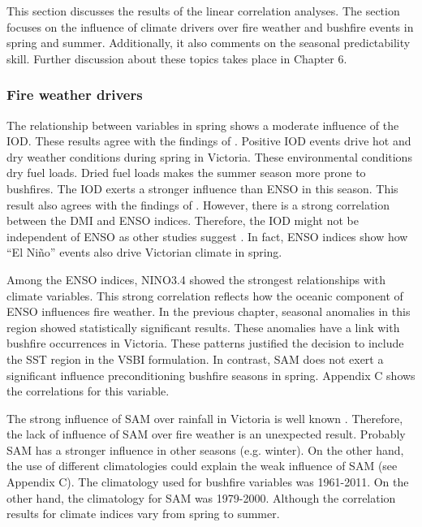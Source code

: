 This section discusses the results of the linear correlation analyses.
The section focuses on the influence of climate drivers over fire
weather and bushfire events in spring and summer. Additionally, it
also comments on the seasonal predictability skill. Further discussion
about these topics takes place in Chapter 6.


\subsubsection{Fire weather drivers}

The relationship between variables in spring shows a moderate influence
of the IOD. These results agree with the findings of \citet{Cai2009}.
Positive IOD events drive hot and dry weather conditions during spring
in Victoria. These environmental conditions dry fuel loads. Dried
fuel loads makes the summer season more prone to bushfires. The IOD
exerts a stronger influence than ENSO in this season. This result
also agrees with the findings of \citet{Cai2009}. However, there
is a strong correlation between the DMI and ENSO indices. Therefore,
the IOD might not be independent of ENSO as other studies suggest
\citep{Dommenget2002}. In fact, ENSO indices show how ``El Ni\~no''
events also drive Victorian climate in spring.

Among the ENSO indices, NINO3.4 showed the strongest relationships
with climate variables. This strong correlation reflects how the oceanic
component of ENSO influences fire weather. In the previous chapter,
seasonal anomalies in this region showed statistically significant
results. These anomalies have a link with bushfire occurrences in
Victoria. These patterns justified the decision to include the SST
region in the VSBI formulation. In contrast, SAM does not exert a
significant influence preconditioning bushfire seasons in spring.
Appendix C shows the correlations for this variable.

The strong influence of SAM over rainfall in Victoria is well known
\citep{Risbey2009b,Ho2011}. Therefore, the lack of influence of SAM
over fire weather is an unexpected result. Probably SAM has a stronger
influence in other seasons (e.g. winter). On the other hand, the use
of different climatologies could explain the weak influence of SAM
(see Appendix C). The climatology used for bushfire variables was
1961-2011. On the other hand, the climatology for SAM was 1979-2000.
Although the correlation results for climate indices vary from spring
to summer.

